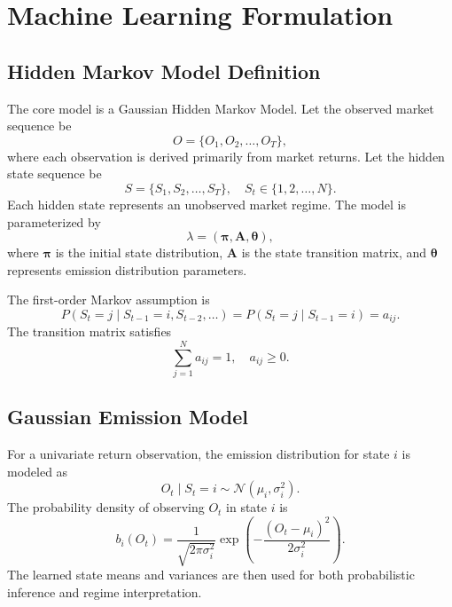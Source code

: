 \documentclass[conference]{IEEEtran}
\begin{document}
\section{Machine Learning Formulation}
\subsection{Hidden Markov Model Definition}
The core model is a Gaussian Hidden Markov Model. Let the observed market sequence be
\begin{equation}
    O = \{O_1, O_2, \ldots, O_T\},
\end{equation}
where each observation is derived primarily from market returns. Let the hidden state sequence be
\begin{equation}
    S = \{S_1, S_2, \ldots, S_T\}, \quad S_t \in \{1,2,\ldots,N\}.
\end{equation}
Each hidden state represents an unobserved market regime. The model is parameterized by
\begin{equation}
    \lambda = (\boldsymbol{\pi}, \mathbf{A}, \boldsymbol{\theta}),
\end{equation}
where $\boldsymbol{\pi}$ is the initial state distribution, $\mathbf{A}$ is the state transition matrix, and $\boldsymbol{\theta}$ represents emission distribution parameters.

The first-order Markov assumption is
\begin{equation}
    P(S_t=j \mid S_{t-1}=i, S_{t-2}, \ldots) = P(S_t=j \mid S_{t-1}=i)=a_{ij}.
\end{equation}
The transition matrix satisfies
\begin{equation}
    \sum_{j=1}^{N} a_{ij}=1, \quad a_{ij} \geq 0.
\end{equation}

\subsection{Gaussian Emission Model}
For a univariate return observation, the emission distribution for state $i$ is modeled as
\begin{equation}
    O_t \mid S_t=i \sim \mathcal{N}(\mu_i, \sigma_i^2).
\end{equation}
The probability density of observing $O_t$ in state $i$ is
\begin{equation}
    b_i(O_t)=\frac{1}{\sqrt{2\pi\sigma_i^2}}
    \exp\left(-\frac{(O_t-\mu_i)^2}{2\sigma_i^2}\right).
\end{equation}
The learned state means and variances are then used for both probabilistic inference and regime interpretation.
\end{document}
